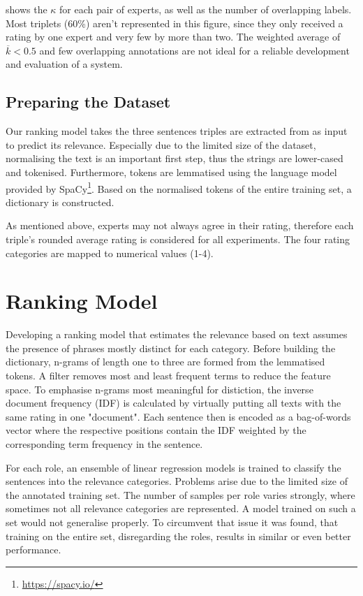  shows the $\kappa$ for each pair of experts, as well as the number of overlapping labels. Most triplets (60\%) aren't represented in this figure, since they only received a rating by one expert and very few by more than two. The weighted average of $\overline{k}<0.5$ and few overlapping annotations are not ideal for a reliable development and evaluation of a system.

\subsection{Preparing the Dataset}
Our ranking model takes the three sentences triples are extracted from as input to predict its relevance. Especially due to the limited size of the dataset, normalising the text is an important first step, thus the strings are lower-cased and tokenised. Furthermore, tokens are lemmatised using the language model provided by SpaCy\footnote{\url{https://spacy.io/}}. Based on the normalised tokens of the entire training set, a dictionary is constructed.

As mentioned above, experts may not always agree in their rating, therefore each triple's rounded average rating is considered for all experiments. The four rating categories are mapped to numerical values (1-4).

\section{Ranking Model}
Developing a ranking model that estimates the relevance based on text assumes the presence of phrases mostly distinct for each category. Before building the dictionary, n-grams of length one to three are formed from the lemmatised tokens. A filter removes most and least frequent terms to reduce the feature space. To emphasise n-grams most meaningful for distiction, the inverse document frequency (IDF) is calculated by virtually putting all texts with the same rating in one "document". Each sentence then is encoded as a bag-of-words vector where the respective positions contain the IDF weighted by the corresponding term frequency in the sentence.

For each role, an ensemble of  linear regression models is trained to classify the sentences into the relevance categories. Problems arise due to the limited size of the annotated training set. The number of samples per role varies strongly, where sometimes not all relevance categories are represented. A model trained on such a set would not generalise properly. To circumvent that issue it was found, that training on the entire set, disregarding the roles, results in similar or even better performance.

